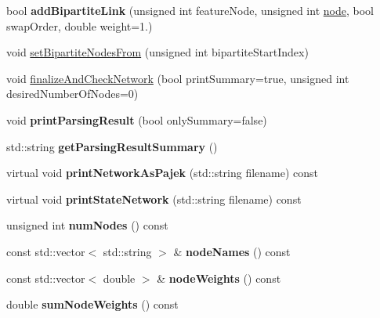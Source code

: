 \begin{DoxyCompactItemize}
bool {\bfseries add\+Bipartite\+Link} (unsigned int feature\+Node, unsigned int \mbox{\hyperlink{structnode}{node}}, bool swap\+Order, double weight=1.)
\item 
void \mbox{\hyperlink{classNetwork_a7ebe3a5e948fc60e81fb94df08ca4358}{set\+Bipartite\+Nodes\+From}} (unsigned int bipartite\+Start\+Index)
\item 
void \mbox{\hyperlink{classNetwork_ac2e5a12947f9983b6193d593ec329a5f}{finalize\+And\+Check\+Network}} (bool print\+Summary=true, unsigned int desired\+Number\+Of\+Nodes=0)
\item 
\mbox{\label{classNetwork_abba53293f1ec45c5e701427e106a8ae4}} 
void {\bfseries print\+Parsing\+Result} (bool only\+Summary=false)
\item 
\mbox{\label{classNetwork_aa469da1457cd376313eac5e30cb16b95}} 
std\+::string {\bfseries get\+Parsing\+Result\+Summary} ()
\item 
\mbox{\label{classNetwork_abf286e55a24a445669b5b08ffbc76951}} 
virtual void {\bfseries print\+Network\+As\+Pajek} (std\+::string filename) const
\item 
\mbox{\label{classNetwork_a59cc353c1629bbf374db045d19ebd4f1}} 
virtual void {\bfseries print\+State\+Network} (std\+::string filename) const
\item 
\mbox{\label{classNetwork_ab4585dd1f2500f16d729096878228942}} 
unsigned int {\bfseries num\+Nodes} () const
\item 
\mbox{\label{classNetwork_a21976797f095a6de32ee40b6c7e39fe6}} 
const std\+::vector$<$ std\+::string $>$ \& {\bfseries node\+Names} () const
\item 
\mbox{\label{classNetwork_a169fbca9d6d0bf7be4afcef36906d197}} 
const std\+::vector$<$ double $>$ \& {\bfseries node\+Weights} () const
\item 
\mbox{\label{classNetwork_a70506aeb202e073077967e9090fc7c70}} 
double {\bfseries sum\+Node\+Weights} () const
\item 
\mbox{\label{classNetwork_a96d7528557fc09561891eeda76499063}} 

\end{DoxyCompactItemize}
